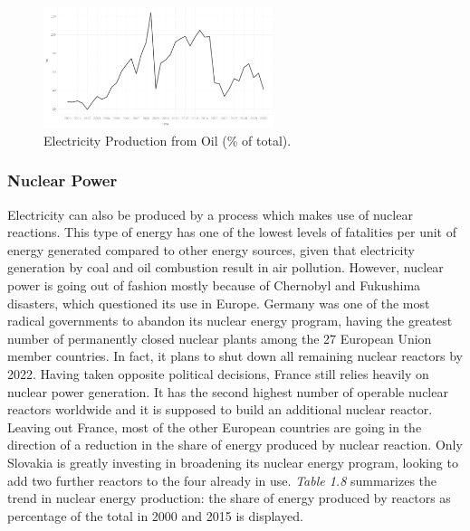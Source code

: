 \documentclass{book}
\begin{document}
\bigskip
\begin{figure}[H]
\begin{center}
\captionsetup{justification=centering}
\includegraphics[width=0.6\textwidth]{Images/oilbeh.png}
\caption{Electricity Production from Oil (\% of total). }
\end{center}
\end{figure}
\bigskip

\subsubsection*{Nuclear Power}

Electricity can also be produced by a process which makes use of nuclear reactions. This type of energy has one of the lowest levels of fatalities per unit of energy generated compared to other energy sources, given that electricity generation by coal and oil combustion result in air pollution. \cite{markandya2007electricity} However, nuclear power is going out of fashion mostly because of Chernobyl and Fukushima disasters, which questioned its use in Europe. Germany was one of the most radical governments to abandon its nuclear energy program, having the greatest number of permanently closed nuclear plants among the 27 European Union member countries. In fact, it plans to shut down all remaining nuclear reactors by 2022. Having taken opposite political decisions, France still relies heavily on nuclear power generation. It has the second highest number of operable nuclear reactors worldwide and it is supposed to build an additional nuclear reactor. Leaving out France, most of the other European countries are going in the direction of a reduction in the share of energy produced by nuclear reaction. Only Slovakia is greatly investing in broadening its nuclear energy program, looking to add two further reactors to the four already in use. \textit{Table 1.8} summarizes the trend in nuclear energy production: the share of energy produced by reactors as percentage of the total in 2000 and 2015 is displayed.
\end{document}

